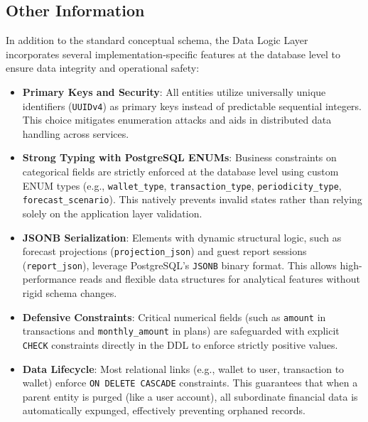 \subsection{Other Information}


In addition to the standard conceptual schema, the Data Logic Layer incorporates several implementation-specific features at the database level to ensure data integrity and operational safety:

\begin{itemize}
    \item \textbf{Primary Keys and Security}: All entities utilize universally unique identifiers (\texttt{UUIDv4}) as primary keys instead of predictable sequential integers. This choice mitigates enumeration attacks and aids in distributed data handling across services.
    \item \textbf{Strong Typing with PostgreSQL ENUMs}: Business constraints on categorical fields are strictly enforced at the database level using custom ENUM types (e.g., \texttt{wallet\_type}, \texttt{transaction\_type}, \texttt{periodicity\_type}, \texttt{forecast\_scenario}). This natively prevents invalid states rather than relying solely on the application layer validation.
    \item \textbf{JSONB Serialization}: Elements with dynamic structural logic, such as forecast projections (\texttt{projection\_json}) and guest report sessions (\texttt{report\_json}), leverage PostgreSQL's \texttt{JSONB} binary format. This allows high-performance reads and flexible data structures for analytical features without rigid schema changes.
    \item \textbf{Defensive Constraints}: Critical numerical fields (such as \texttt{amount} in transactions and \texttt{monthly\_amount} in plans) are safeguarded with explicit \texttt{CHECK} constraints directly in the DDL to enforce strictly positive values.
    \item \textbf{Data Lifecycle}: Most relational links (e.g., wallet to user, transaction to wallet) enforce \texttt{ON DELETE CASCADE} constraints. This guarantees that when a parent entity is purged (like a user account), all subordinate financial data is automatically expunged, effectively preventing orphaned records.
\end{itemize}